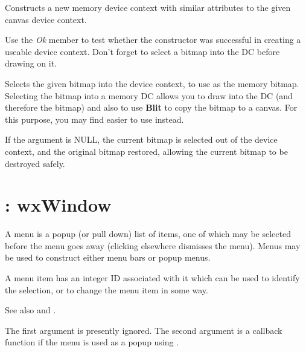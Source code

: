 
Constructs a new memory device context with similar attributes to the
given canvas device context.

Use the {\it Ok} member to test whether the constructor was successful
in creating a useable device context. Don't forget to select a bitmap
into the DC before drawing on it.



Selects the given bitmap into the device context, to use as the memory
bitmap. Selecting the bitmap into a memory DC allows you to draw into
the DC (and therefore the bitmap) and also to use {\bf Blit} to copy
the bitmap to a canvas. For this purpose, you may find \rtfsp
easier to use instead.

If the argument is NULL, the current bitmap is selected out of the device
context, and the original bitmap restored, allowing the current bitmap to
be destroyed safely.

\section{: wxWindow}\label{wxmenu}

A menu is a popup (or pull down) list of items, one of which may be
selected before the menu goes away (clicking elsewhere dismisses the
menu).  Menus may be used to construct either menu bars or popup menus.

A menu item has an integer ID associated with it which can be used to
identify the selection, or to change the menu item in some way.

See also  and .



The first argument is presently ignored. The second argument is 
a callback function if the menu is used as a popup using .



